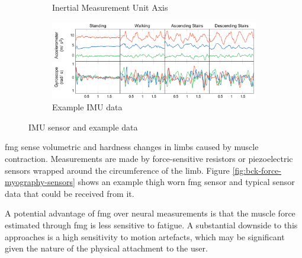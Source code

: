 \begin{figure}[!hbtp]
\begin{subfigure}[b]{0.45\textwidth}
        \caption{Inertial Measurement Unit Axis\cite{Kardos2017}}
    \end{subfigure}
    \begin{subfigure}[b]{0.9\textwidth}
        \centering
        \includegraphics[width=\textwidth]{content/2-Background/sensors/imu_sensor_data.png}
        \caption{Example IMU data\cite{Formento2014}}
    \end{subfigure}
    \caption{IMU sensor and example data}
    \label{fig:bck-imu-sensors}
\end{figure}

\acrlong{fmg} sense volumetric and hardness changes in limbs caused by muscle contraction. Measurements are made by force-sensitive resistors or piezoelectric sensors wrapped around the circumference of the limb. Figure \ref{fig:bck-force-myography-sensors} shows an example thigh worn \acrshort{fmg} sensor and typical sensor data that could be received from it.\cite{Godiyal2018a, Jiang2018}

A potential advantage of \acrshort{fmg} over neural measurements is that the muscle force estimated through \acrshort{fmg} is less sensitive to fatigue. A substantial downside to this approaches is a high sensitivity to motion artefacts, which may be significant given the nature of the physical attachment to the user.\cite{Tucker2015}


